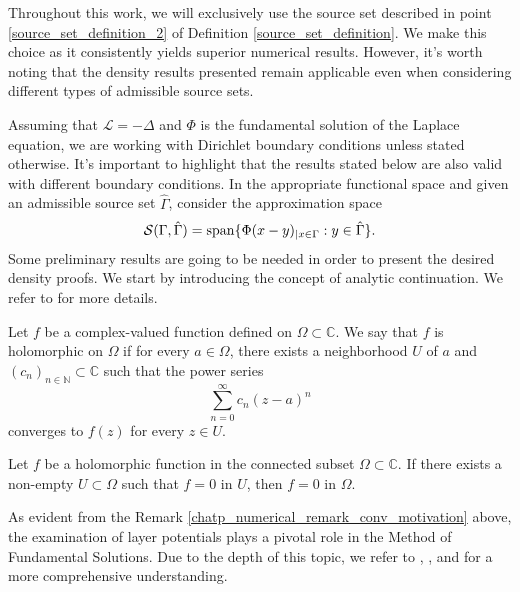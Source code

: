Throughout this work, we will exclusively use the source set described in point \ref{source_set_definition_2} of Definition \ref{source_set_definition}. We make this choice as it consistently yields superior numerical results. However, it's worth noting that the density results presented remain applicable even when considering different types of admissible source sets.

Assuming that $\mathcal{L} = -\Delta$ and $\Phi$ is the fundamental solution of the Laplace equation, we are working with Dirichlet boundary conditions unless stated otherwise. It's important to highlight that the results stated below are also valid with different boundary conditions. In the appropriate functional space and given an admissible source set $\hat{\Gamma}$, consider the approximation space
\[
    \mathcal{S}(\Gamma, \hat{\Gamma}) = \operatorname{span}\{\Phi(x-y)_{|x \in \Gamma} : y \in \hat{\Gamma}\}.
\]
Some preliminary results are going to be needed in order to present the desired density proofs.
We start by introducing the concept of analytic continuation. We refer to \cite{narasimhan2012complex} for more details.
\begin{definition}
    Let \(f\) be a complex-valued function defined on \(\Omega \subset \mathbb{C}\). We say that \(f\) is holomorphic on \(\Omega\) if for every \(a \in \Omega\), there exists a neighborhood \(U\) of \(a\) and \((c_n)_{n \in \mathbb{N}} \subset \mathbb{C}\) such that the power series
    \[
        \sum_{n=0}^{\infty} c_n(z-a)^n
    \]
    converges to \(f(z)\) for every \(z \in U\).
\end{definition}
\begin{theorem}\label{ana_cont}
    Let \(f\) be a holomorphic function in the connected subset \(\Omega \subset \mathbb{C}\). If there exists a non-empty \(U \subset \Omega\) such that \(f = 0\) in \(U\), then \(f = 0\) in \(\Omega\).
\end{theorem}
As evident from the Remark \ref{chatp_numerical_remark_conv_motivation} above, the examination of layer potentials plays a pivotal role in the Method of Fundamental Solutions. Due to the depth of this topic, we refer to \cite{chen2010boundary}, \cite{kress2013linear}, and \cite{colton2013integral} for a more comprehensive understanding.

